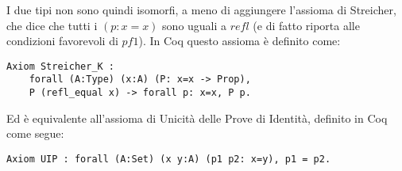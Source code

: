 I due tipi non sono quindi isomorfi, a meno di aggiungere l'assioma di Streicher, che dice che tutti i $(p : x = x)$ sono uguali a $refl$ (e di fatto riporta alle condizioni favorevoli di $pf1$). In Coq questo assioma è definito come:
\begin{lstlisting}[language=Coq]
Axiom Streicher_K : 
	forall (A:Type) (x:A) (P: x=x -> Prop), 
	P (refl_equal x) -> forall p: x=x, P p. 
\end{lstlisting}
Ed è equivalente all'assioma di Unicità delle Prove di Identità, definito in Coq come segue:
\begin{lstlisting}[language=Coq]
Axiom UIP : forall (A:Set) (x y:A) (p1 p2: x=y), p1 = p2. 
\end{lstlisting}

